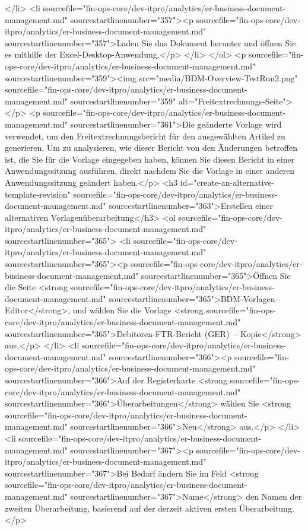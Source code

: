 </li>
<li sourcefile="fin-ops-core/dev-itpro/analytics/er-business-document-management.md" sourcestartlinenumber="357"><p sourcefile="fin-ops-core/dev-itpro/analytics/er-business-document-management.md" sourcestartlinenumber="357">Laden Sie das Dokument herunter und öffnen Sie es mithilfe der Excel-Desktop-Anwendung.</p>
</li>
</ol>
<p sourcefile="fin-ops-core/dev-itpro/analytics/er-business-document-management.md" sourcestartlinenumber="359"><img src="media/BDM-Overview-TestRun2.png" sourcefile="fin-ops-core/dev-itpro/analytics/er-business-document-management.md" sourcestartlinenumber="359" alt="Freitextrechnungs-Seite"></p>
<p sourcefile="fin-ops-core/dev-itpro/analytics/er-business-document-management.md" sourcestartlinenumber="361">Die geänderte Vorlage wird verwendet, um den Freitextrechnungsbericht für den ausgewählten Artikel zu generieren. Um zu analysieren, wie dieser Bericht von den Änderungen betroffen ist, die Sie für die Vorlage eingegeben haben, können Sie diesen Bericht in einer Anwendungssitzung ausführen, direkt nachdem Sie die Vorlage in einer anderen Anwendungssitzung geändert haben.</p>
<h3 id="create-an-alternative-template-revision" sourcefile="fin-ops-core/dev-itpro/analytics/er-business-document-management.md" sourcestartlinenumber="363">Erstellen einer alternativen Vorlagenüberarbeitung</h3>
<ol sourcefile="fin-ops-core/dev-itpro/analytics/er-business-document-management.md" sourcestartlinenumber="365">
<li sourcefile="fin-ops-core/dev-itpro/analytics/er-business-document-management.md" sourcestartlinenumber="365"><p sourcefile="fin-ops-core/dev-itpro/analytics/er-business-document-management.md" sourcestartlinenumber="365">Öffnen Sie die Seite <strong sourcefile="fin-ops-core/dev-itpro/analytics/er-business-document-management.md" sourcestartlinenumber="365">BDM-Vorlagen-Editor</strong>, und wählen Sie die Vorlage <strong sourcefile="fin-ops-core/dev-itpro/analytics/er-business-document-management.md" sourcestartlinenumber="365">Debitoren-FTR-Bericht (GER) – Kopie</strong> aus.</p>
</li>
<li sourcefile="fin-ops-core/dev-itpro/analytics/er-business-document-management.md" sourcestartlinenumber="366"><p sourcefile="fin-ops-core/dev-itpro/analytics/er-business-document-management.md" sourcestartlinenumber="366">Auf der Registerkarte <strong sourcefile="fin-ops-core/dev-itpro/analytics/er-business-document-management.md" sourcestartlinenumber="366">Überarbeitungen</strong> wählen Sie <strong sourcefile="fin-ops-core/dev-itpro/analytics/er-business-document-management.md" sourcestartlinenumber="366">Neu</strong> aus.</p>
</li>
<li sourcefile="fin-ops-core/dev-itpro/analytics/er-business-document-management.md" sourcestartlinenumber="367"><p sourcefile="fin-ops-core/dev-itpro/analytics/er-business-document-management.md" sourcestartlinenumber="367">Bei Bedarf ändern Sie im Feld <strong sourcefile="fin-ops-core/dev-itpro/analytics/er-business-document-management.md" sourcestartlinenumber="367">Name</strong> den Namen der zweiten Überarbeitung, basierend auf der derzeit aktiven ersten Überarbeitung.</p>
